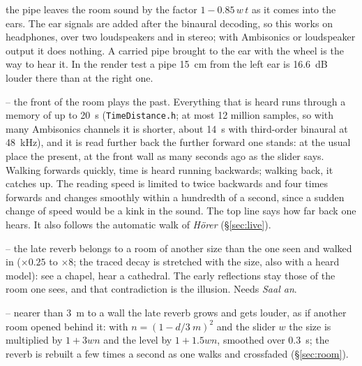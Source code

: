 \documentclass[11pt,a4paper,parskip=half,DIV=11,toc=bibliography]{scrartcl}
\newcommand{\ui}[1]{\emph{#1}}                 %
\newcommand{\fn}[1]{\mbox{\texttt{#1}}}
\begin{document}
\begin{description}
        the pipe leaves the room sound by the factor $1-0.85\,w\,t$ as it comes into the ears. The ear signals are added after the binaural decoding,
        so this works on headphones, over two loudspeakers and in stereo; with Ambisonics or loudspeaker output it does nothing. A carried pipe
        brought to the ear with the wheel is the way to hear it. In the render test a pipe \SI{15}{cm} from the left ear is \SI{16.6}{dB} louder there than
        at the right one.
  \item[Zeit als Entfernung] -- the front of the room plays the past. Everything that is heard runs through a memory of up to \SI{20}{s}
        (\fn{TimeDistance.h}; at most 12 million samples, so with many Ambisonics channels it is shorter, about \SI{14}{s} with third-order binaural at
        \SI{48}{kHz}), and it is read further back the further forward one stands: at the usual place the present, at the front wall as many seconds
        ago as the slider says. Walking forwards quickly, time is heard running backwards; walking back, it catches up. The reading speed is limited to
        twice backwards and four times forwards and changes smoothly within a hundredth of a second, since a sudden change of speed would be a kink in the
        sound. The top line says how far back one hears. It also follows the automatic walk of \ui{Hörer} (\S\ref{sec:live}).
  \item[Hörraum] -- the late reverb belongs to a room of another size than the one seen and walked in ($\times0.25$ to $\times8$; the traced decay is
        stretched with the size, also with a heard model): see a chapel, hear a cathedral. The early reflections stay those of the room one sees, and that
        contradiction is the illusion. Needs \ui{Saal an}.
  \item[Wandnähe] -- nearer than \SI{3}{m} to a wall the late reverb grows and gets louder, as if another room opened behind it: with $n = (1-d/\SI{3}{m})^2$
        and the slider $w$ the size is multiplied by $1+3wn$ and the level by $1+1.5wn$, smoothed over \SI{0.3}{s}; the reverb is rebuilt a few times a second
        as one walks and crossfaded (\S\ref{sec:room}).
\end{description}
\end{document}
